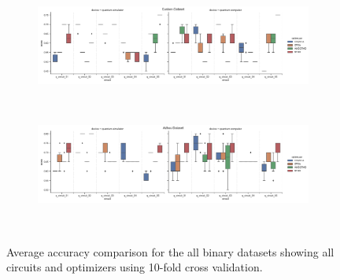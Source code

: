 \begin{figure}[!ht]
\begin{subfigure}{1.0\textwidth}
        \centering
        \includegraphics[width=1.0\linewidth]{thesis/Figures/qnn/boxplots/100_custom.png}
        \label{subfigure:accuracy_comparison_boxplots_custom_dataset1}
    \end{subfigure}
    \\[-3ex]
    \begin{subfigure}{1.0\textwidth}
        \centering
        \includegraphics[width=1.0\linewidth]{thesis/Figures/qnn/boxplots/100_adhoc.png}
        \label{subfigure:accuracy_comparison_boxplots_adhoc_dataset1}
    \end{subfigure}
    \\[-3ex]
    \caption{Average accuracy comparison for the all binary datasets showing all circuits and optimizers using 10-fold cross validation.}
    \label{figure:accuracy_comparison_boxplots_binary_datasets}
\end{figure}


\clearpage